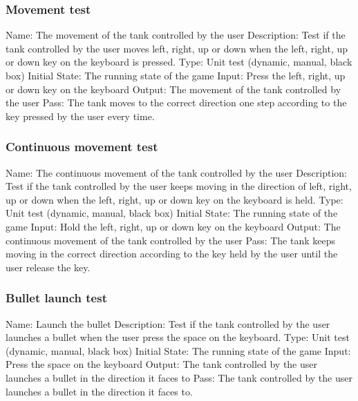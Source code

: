 \documentclass{article}
\begin{document}
\subsubsection{Movement test}
Name:  The movement of the tank controlled by the user\newline
Description: Test if the tank controlled by the user moves left, right, up or 
down when the left, right, up or down key on the keyboard is pressed. \newline
Type: Unit test (dynamic, manual, black box) \newline
Initial State:  The running state of the game \newline
Input: Press the left, right, up or down key on the keyboard\newline
Output: The movement of the tank controlled by the user \newline
Pass: The tank moves to the correct direction one step according to the key 
pressed by the user every time. \newline

\subsubsection{Continuous movement test}
Name:  The continuous movement of the tank controlled by the user\newline
Description: Test if the tank controlled by the user keeps moving in the 
direction of left, right, up or down when the left, right, up or down key on 
the keyboard is held. \newline
Type: Unit test (dynamic, manual, black box) \newline
Initial State:  The running state of the game \newline
Input: Hold the left, right, up or down key on the keyboard\newline
Output: The continuous movement of the tank controlled by the user\newline
Pass:  The tank keeps moving in the correct direction according to the key 
held by the user until the user release the key. \newline

\subsubsection{Bullet launch test}
Name:  Launch the bullet\newline
Description: Test if the tank controlled by the user launches a bullet when 
the user press the space on the keyboard. \newline
Type: Unit test (dynamic, manual, black box) \newline
Initial State: The running state of the game \newline
Input: Press the space on the keyboard\newline
Output: The tank controlled by the user launches a bullet in the direction it 
faces to \newline
Pass: The tank controlled by the user launches a bullet in the direction it 
faces to. \newline
\end{document}

